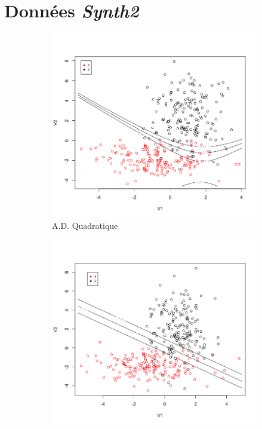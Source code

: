 \documentclass[a4paper,10pt]{report}
\begin{document}
\section{Données \textit{Synth2}}
\label{appendix:front-decision-synth-2}

\begin{figure}[H]
	\centering
	\captionsetup{justification=centering, margin=2cm}
	\begin{subfigure}[b]{0.45\linewidth}
		\centering
		\captionsetup{justification=centering, margin=1cm}
		\includegraphics[width=1\linewidth]{img/front-decision-synth-2-adq}
		\caption{\small A.D. Quadratique}
		\label{fig:front-decision-synth-2-adq}%
	\end{subfigure}%
	\begin{subfigure}[b]{0.45\linewidth}
		\centering
		\captionsetup{justification=centering, margin=1cm}
		\includegraphics[width=1\linewidth]{img/front-decision-synth-2-adl}

\end{subfigure}
\end{figure}
\end{document}
